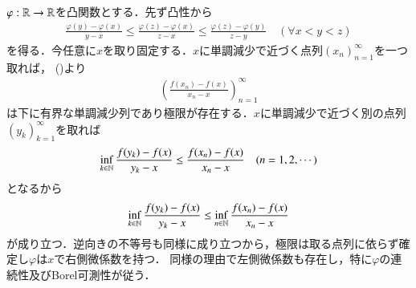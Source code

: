 	\begin{prf}
		$\varphi:\mathbb{R} \rightarrow \mathbb{R}$を凸関数とする．先ず凸性から
		\begin{align}
			\frac{\varphi(y) - \varphi(x)}{y - x} 
			\leq \frac{\varphi(z) - \varphi(x)}{z - x}
			\leq \frac{\varphi(z) - \varphi(y)}{z - y}
			\quad (\forall x < y < z)
			\label{ineq:lem:convex_function_measurability_1}
		\end{align}
		を得る．今任意に$x$を取り固定する．$x$に単調減少で近づく点列$(x_n)_{n=1}^{\infty}$を一つ取れば，
		()より
		 \begin{align}
		 	\left(\frac{f(x_n)-f(x)}{x_n-x}\right)_{n=1}^{\infty} 
		 	\label{seq:lem:convex_function_measurability_2}
		 \end{align}
		 は下に有界な単調減少列であり極限が存在する．$x$に単調減少で近づく別の点列$(y_k)_{k=1}^{\infty}$を取れば
		 \begin{align}
		 	\operatorname*{inf}_{k \in \mathbb{N}} \frac{f(y_k)-f(x)}{y_k-x} \leq \frac{f(x_n)-f(x)}{x_n-x} \quad (n=1,2,\cdots)
		 \end{align}
		 となるから
		 \begin{align}
		 	\operatorname*{inf}_{k \in \mathbb{N}} \frac{f(y_k)-f(x)}{y_k-x} \leq \operatorname*{inf}_{n \in \mathbb{N}} \frac{f(x_n)-f(x)}{x_n-x}
		 \end{align}
		 が成り立つ．逆向きの不等号も同様に成り立つから，極限は取る点列に依らず確定し$\varphi$は$x$で右側微係数を持つ．
		 同様の理由で左側微係数も存在し，特に$\varphi$の連続性及びBorel可測性が従う．
		 \QED
	\end{prf}
	
